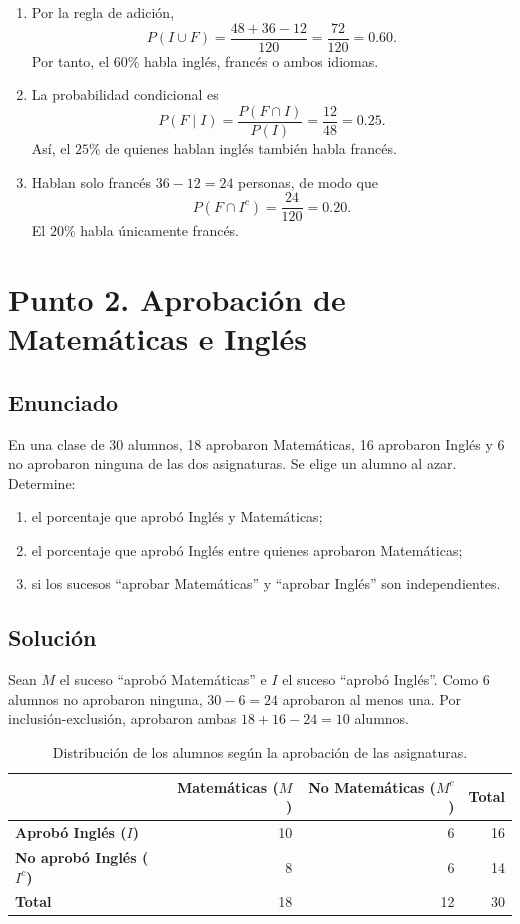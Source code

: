 \documentclass[12pt]{article}
\begin{document}
\begin{enumerate}
    \item Por la regla de adición,
    \[
    P(I\cup F)=\frac{48+36-12}{120}=\frac{72}{120}=0.60.
    \]
    Por tanto, el $60\%$ habla inglés, francés o ambos idiomas.
    \item La probabilidad condicional es
    \[
    P(F\mid I)=\frac{P(F\cap I)}{P(I)}=\frac{12}{48}=0.25.
    \]
    Así, el $25\%$ de quienes hablan inglés también habla francés.
    \item Hablan solo francés $36-12=24$ personas, de modo que
    \[
    P(F\cap I^c)=\frac{24}{120}=0.20.
    \]
    El $20\%$ habla únicamente francés.
\end{enumerate}

\section*{Punto 2. Aprobación de Matemáticas e Inglés}

\subsection*{Enunciado}

En una clase de 30 alumnos, 18 aprobaron Matemáticas, 16 aprobaron Inglés y 6 no aprobaron ninguna de las dos asignaturas. Se elige un alumno al azar. Determine:

\begin{enumerate}
    \item el porcentaje que aprobó Inglés y Matemáticas;
    \item el porcentaje que aprobó Inglés entre quienes aprobaron Matemáticas;
    \item si los sucesos ``aprobar Matemáticas'' y ``aprobar Inglés'' son independientes.
\end{enumerate}

\subsection*{Solución}

Sean $M$ el suceso ``aprobó Matemáticas'' e $I$ el suceso ``aprobó Inglés''. Como 6 alumnos no aprobaron ninguna, $30-6=24$ aprobaron al menos una. Por inclusión-exclusión, aprobaron ambas $18+16-24=10$ alumnos.

\begin{table}[H]
\centering
\small
\renewcommand{\arraystretch}{1.15}
\begin{tabular}{|l|r|r|r|}
\hline
 & \textbf{Matemáticas ($M$)} & \textbf{No Matemáticas ($M^c$)} & \textbf{Total} \\ \hline
\textbf{Aprobó Inglés ($I$)} & 10 & 6 & 16 \\ \hline
\textbf{No aprobó Inglés ($I^c$)} & 8 & 6 & 14 \\ \hline
\textbf{Total} & 18 & 12 & 30 \\ \hline
\end{tabular}
\caption{Distribución de los alumnos según la aprobación de las asignaturas.}
\label{tab:aprobacion}
\end{table}
\end{document}
